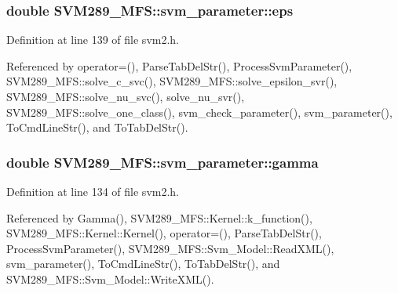 \subsubsection[{\texorpdfstring{eps}{eps}}]{\setlength{\rightskip}{0pt plus 5cm}double S\+V\+M289\+\_\+\+M\+F\+S\+::svm\+\_\+parameter\+::eps}\hypertarget{struct_s_v_m289___m_f_s_1_1svm__parameter_aa5c12a469759ffdc931e8b8ef2496cc4}{}\label{struct_s_v_m289___m_f_s_1_1svm__parameter_aa5c12a469759ffdc931e8b8ef2496cc4}


Definition at line 139 of file svm2.\+h.



Referenced by operator=(), Parse\+Tab\+Del\+Str(), Process\+Svm\+Parameter(), S\+V\+M289\+\_\+\+M\+F\+S\+::solve\+\_\+c\+\_\+svc(), S\+V\+M289\+\_\+\+M\+F\+S\+::solve\+\_\+epsilon\+\_\+svr(), S\+V\+M289\+\_\+\+M\+F\+S\+::solve\+\_\+nu\+\_\+svc(), solve\+\_\+nu\+\_\+svr(), S\+V\+M289\+\_\+\+M\+F\+S\+::solve\+\_\+one\+\_\+class(), svm\+\_\+check\+\_\+parameter(), svm\+\_\+parameter(), To\+Cmd\+Line\+Str(), and To\+Tab\+Del\+Str().

\subsubsection[{\texorpdfstring{gamma}{gamma}}]{\setlength{\rightskip}{0pt plus 5cm}double S\+V\+M289\+\_\+\+M\+F\+S\+::svm\+\_\+parameter\+::gamma}\hypertarget{struct_s_v_m289___m_f_s_1_1svm__parameter_af967d55614f8fe7c1da5936a9f2b048d}{}\label{struct_s_v_m289___m_f_s_1_1svm__parameter_af967d55614f8fe7c1da5936a9f2b048d}


Definition at line 134 of file svm2.\+h.



Referenced by Gamma(), S\+V\+M289\+\_\+\+M\+F\+S\+::\+Kernel\+::k\+\_\+function(), S\+V\+M289\+\_\+\+M\+F\+S\+::\+Kernel\+::\+Kernel(), operator=(), Parse\+Tab\+Del\+Str(), Process\+Svm\+Parameter(), S\+V\+M289\+\_\+\+M\+F\+S\+::\+Svm\+\_\+\+Model\+::\+Read\+X\+M\+L(), svm\+\_\+parameter(), To\+Cmd\+Line\+Str(), To\+Tab\+Del\+Str(), and S\+V\+M289\+\_\+\+M\+F\+S\+::\+Svm\+\_\+\+Model\+::\+Write\+X\+M\+L().

